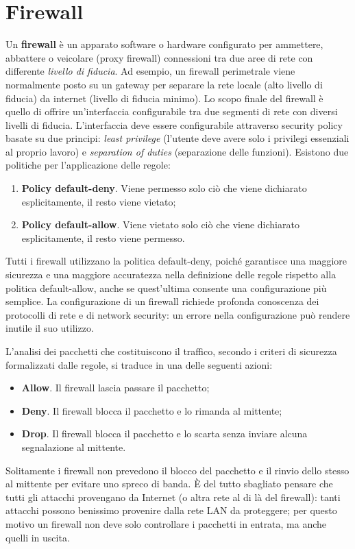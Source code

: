 \chapter{Firewall}
Un \textbf{firewall} è un apparato software o hardware configurato per ammettere, abbattere o veicolare (proxy firewall) connessioni tra due aree di rete con differente \textit{livello di fiducia}. Ad esempio, un firewall perimetrale viene normalmente posto su un gateway per separare la rete locale (alto livello di fiducia) da internet (livello di fiducia minimo). Lo scopo finale del firewall è quello di offrire un'interfaccia configurabile tra due segmenti di rete con diversi livelli di fiducia. L'interfaccia deve essere configurabile attraverso security policy basate su due principi: \textit{least privilege} (l'utente deve avere solo i privilegi essenziali al proprio lavoro) e \textit{separation of duties} (separazione delle funzioni). Esistono due politiche per l'applicazione delle regole:
\begin{enumerate}
	\item \textbf{Policy default-deny}. Viene permesso solo ciò che viene dichiarato esplicitamente, il resto viene vietato;
	\item \textbf{Policy default-allow}. Viene vietato solo ciò che viene dichiarato esplicitamente, il resto viene permesso.
\end{enumerate}
Tutti i firewall utilizzano la politica default-deny, poiché garantisce una maggiore sicurezza e una maggiore accuratezza nella definizione delle regole rispetto alla politica default-allow, anche se quest'ultima consente una configurazione più semplice. La configurazione di un firewall richiede profonda conoscenza dei protocolli di rete e di network security: un errore nella configurazione può rendere inutile il suo utilizzo.

L'analisi dei pacchetti che costituiscono il traffico, secondo i criteri di sicurezza formalizzati dalle regole, si traduce in una delle seguenti azioni:
\begin{itemize}
	\item \textbf{Allow}. Il firewall lascia passare il pacchetto;
	\item \textbf{Deny}. Il firewall blocca il pacchetto e lo rimanda al mittente;
	\item \textbf{Drop}. Il firewall blocca il pacchetto e lo scarta senza inviare alcuna segnalazione al mittente.
\end{itemize}
Solitamente i firewall non prevedono il blocco del pacchetto e il rinvio dello stesso al mittente per evitare uno spreco di banda. È del tutto sbagliato pensare che tutti gli attacchi provengano da Internet (o altra rete al di là del firewall): tanti attacchi possono benissimo provenire dalla rete LAN da proteggere; per questo motivo un firewall non deve solo controllare i pacchetti in entrata, ma anche quelli in uscita.

